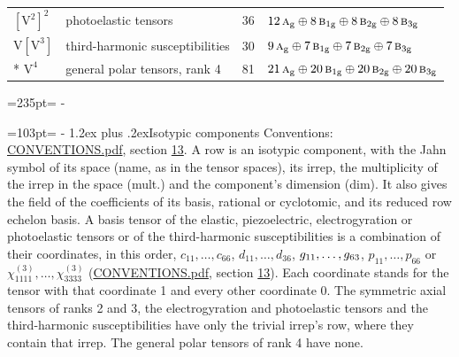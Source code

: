 \documentclass[10pt,a4paper]{article}
\makeatletter
\renewcommand\section{\@startsection{section}{1}{\z@}{-3ex plus -1ex minus -.2ex}%
  {1.2ex plus .2ex}{\normalfont\large\sffamily\bfseries\color{parttitle}}}
\newcommand{\needspace}[1]{\par\penalty-100\begingroup\dimen0=#1\relax\dimen2=\pagegoal
  \advance\dimen2-\pagetotal\ifdim\dimen0>\dimen2\relax\ifdim\dimen2>0pt\vfil\break\fi\fi
  \endgroup}
\numberwithin{equation}{section}
\newcommand{\irr}[1]{\text{\normalfont\scshape #1}}
\newcommand{\ptag}[1]{\mathrm{#1}}
\newcommand{\jahn}[1]{\mathrm{#1}}
\newlength{\fillwidth}\newlength{\cellwidth}\newlength{\colwidth}
\makeatother
\begin{document}
{\begin{longtable}{@{}llr>{\RaggedRight\arraybackslash}p{\fillwidth}@{}}
$\jahn{[V^{2}]^{2}}$ & photoelastic tensors & 36 & $12\,\irr{a}_{\ptag{g}} \oplus\allowbreak 8\,\irr{b}_{1\ptag{g}} \oplus\allowbreak 8\,\irr{b}_{2\ptag{g}} \oplus\allowbreak 8\,\irr{b}_{3\ptag{g}}$\\
$\jahn{V[V^{3}]}$ & third-harmonic susceptibilities & 30 & $9\,\irr{a}_{\ptag{g}} \oplus\allowbreak 7\,\irr{b}_{1\ptag{g}} \oplus\allowbreak 7\,\irr{b}_{2\ptag{g}} \oplus\allowbreak 7\,\irr{b}_{3\ptag{g}}$\\*
$\jahn{V^{4}}$ & general polar tensors, rank 4 & 81 & $21\,\irr{a}_{\ptag{g}} \oplus\allowbreak 20\,\irr{b}_{1\ptag{g}} \oplus\allowbreak 20\,\irr{b}_{2\ptag{g}} \oplus\allowbreak 20\,\irr{b}_{3\ptag{g}}$\\
\bottomrule\end{longtable}}
\needspace{235pt}
\needspace{103pt}
\section{Isotypic components}\label{s:isotypic}
Conventions: \href{../../CONVENTIONS.pdf}{CONVENTIONS.pdf}, section \href{../../CONVENTIONS.pdf\#conv.13}{13}.
\leavevmode\label{n:head.multiplicity}A row is an isotypic component, with the Jahn symbol of its space (name, as in the tensor spaces), its irrep, the multiplicity of the irrep in the space (mult.) and the component's dimension (dim). \label{n:head.coefficients}\label{n:head.basis}It also gives the field of the coefficients of its basis, rational or cyclotomic, and its reduced row echelon basis. \label{n:matrix.elastic}\label{n:matrix.piezoelectric}\label{n:matrix.electrogyration}\label{n:matrix.photoelastic}\label{n:matrix.susceptibility}A basis tensor of the elastic, piezoelectric, electrogyration or photoelastic tensors or of the third-harmonic susceptibilities is a combination of their coordinates, in this order, $c_{11}, \dots, c_{66}$, $d_{11}, \dots, d_{36}$, $\mathnormal{g}_{11}, \dots, \mathnormal{g}_{63}$, $p_{11}, \dots, p_{66}$ or $\chi^{(3)}_{1111}, \dots, \chi^{(3)}_{3333}$ (\href{../../CONVENTIONS.pdf}{CONVENTIONS.pdf}, section \href{../../CONVENTIONS.pdf\#conv.13}{13}). Each coordinate stands for the tensor with that coordinate 1 and every other coordinate 0. The symmetric axial tensors of ranks 2 and 3, the electrogyration and photoelastic tensors and the third-harmonic susceptibilities have only the trivial irrep's row, where they contain that irrep. The general polar tensors of rank 4 have none.
\end{document}
